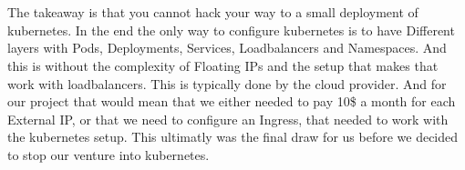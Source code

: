 \documentclass[12pt]{article}
\begin{document}
\\\\
The takeaway is that you cannot hack your way to a small deployment of kubernetes. In the end the only way to configure kubernetes is to have Different layers with Pods, Deployments, Services, Loadbalancers and Namespaces. And this is without the complexity of Floating IPs and the setup that makes that work with loadbalancers. This is typically done by the cloud provider. And for our project that would mean that we either needed to pay 10\$ a month for each External IP, or that we need to configure an Ingress, that needed to work with the kubernetes setup. This ultimatly was the final draw for us before we decided to stop our venture into kubernetes.   
\end{document}
